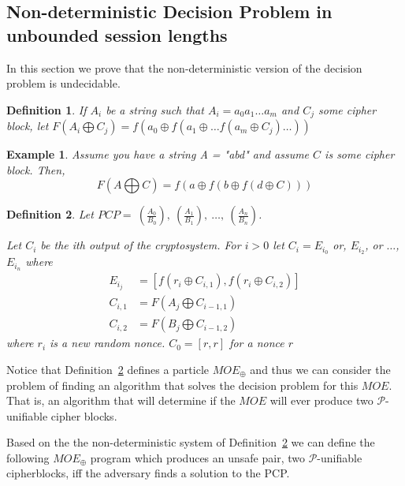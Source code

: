 \documentclass{easychair}
\newtheorem{definition}{Definition}
\newtheorem{example}{Example}
\begin{document}
\subsection{Non-deterministic Decision Problem in unbounded session 
	lengths}

In this section we prove that the non-deterministic version 
of the decision problem is undecidable.

\begin{definition}
If $A_i$ be a string such that $A_i = a_0 a_1\ldots a_m$ and 
$C_j$ some cipher block, let $F(A_i \bigoplus C_j) =
f(a_0 \oplus f(a_1 \oplus \ldots f(a_m \oplus C_j) \ldots ))$
\end{definition}

\begin{example}
Assume you have a string A = "abd" and assume $C$ is some cipher
block. Then, 
\[F(A \bigoplus C) = 
f(a \oplus f(b \oplus f(d \oplus C)))
\]
\end{example}



\begin{definition}\label{non-det-func}
Let $PCP = ~(\frac{A_0}{B_0}), ~(\frac{A_1}{B_1}), ~\ldots, ~(\frac{A_n}{B_n})$. 	
	
Let $C_i$ be the ith output of the cryptosystem. 
For $i > 0$ let $C_i = E_{i_0}$ or, $E_{i_2}$, or $\ldots$,
$E_{i_n}$ where 
\begin{align*}
	E_{i_j} &= [f(r_i \oplus C_{i, 1}), f(r_i \oplus C_{i,2}) ] \\
	C_{i,1} &= F(A_j \bigoplus C_{i-1, 1})	\\
	C_{i,2} &= F(B_j \bigoplus C_{i-1, 2}) 
\end{align*}
where $r_i$ is a new random nonce.
$C_0 = [r,r]$ for a nonce $r$
\end{definition}

Notice that Definition~\ref{non-det-func} defines a 
particle $MOE_{\oplus}$ and thus we can consider the problem 
of finding an algorithm that solves the decision problem for
this $MOE$. That is, an algorithm that will determine if 
the $MOE$ will ever produce two $\mathcal{P}$-unifiable
cipher blocks.

Based on the the non-deterministic system of 
Definition~\ref{non-det-func} we can define the following
$MOE_{\oplus}$ program which produces an unsafe pair, 
two $\mathcal{P}$-unifiable cipherblocks, iff the adversary
finds a solution to the PCP.
\end{document}
